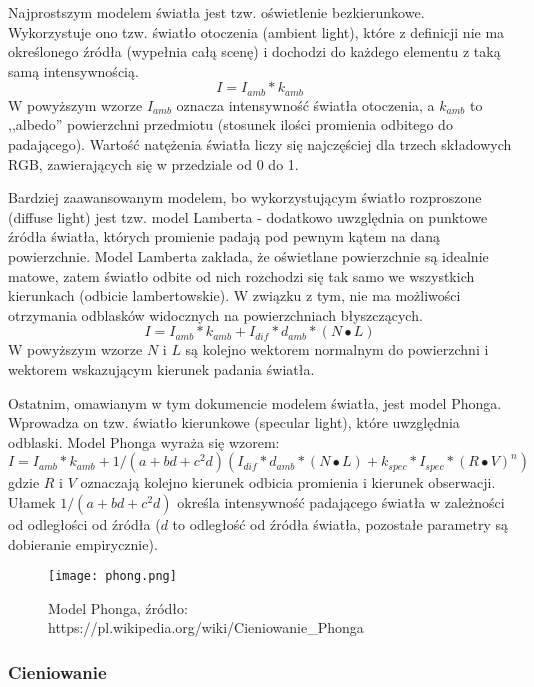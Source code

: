 Najprostszym modelem światła jest tzw. oświetlenie bezkierunkowe. Wykorzystuje ono tzw. światło otoczenia (ambient light), które z definicji nie ma określonego źródła (wypełnia całą scenę) i dochodzi do każdego elementu z taką samą intensywnością.
$$I = I_{amb} * k_{amb}$$
W powyższym wzorze $I_{amb}$ oznacza intensywność światła otoczenia, a $k_{amb}$ to ,,albedo'' powierzchni przedmiotu (stosunek ilości promienia odbitego do padającego). Wartość natężenia światła liczy się najczęściej dla trzech składowych RGB, zawierających się w przedziale od 0 do 1.


Bardziej zaawansowanym modelem, bo wykorzystującym światło rozproszone (diffuse light) jest tzw. model Lamberta - dodatkowo uwzględnia on punktowe źródła światła, których promienie padają pod pewnym kątem na daną powierzchnie. Model Lamberta zakłada, że oświetlane powierzchnie są idealnie matowe, zatem światło odbite od nich rozchodzi się tak samo we wszystkich kierunkach (odbicie lambertowskie). W związku z tym, nie ma możliwości otrzymania odblasków widocznych na powierzchniach błyszczących.
$$I = I_{amb} * k_{amb} + I_{dif} * d_{amb} * (N \bullet L)$$
W powyższym wzorze $N$ i $L$ są kolejno wektorem normalnym do powierzchni i wektorem wskazującym kierunek padania światła.


Ostatnim, omawianym w tym dokumencie modelem światła, jest model Phonga. Wprowadza on tzw. światło kierunkowe (specular light), które uwzględnia odblaski. Model Phonga wyraża się wzorem:
$$I = I_{amb} * k_{amb} + 1/(a + bd + c^2d)(I_{dif} * d_{amb} * (N \bullet L) + k_{spec} * I_{spec} * (R \bullet V)^n)$$
gdzie $R$ i $V$ oznaczają kolejno kierunek odbicia promienia i kierunek obserwacji. Ułamek $1/(a + bd + c^2d)$ określa intensywność padającego światła w zależności od odległości od źródła ($d$ to odległość od źródła światła, pozostałe parametry są dobieranie empirycznie).

\begin{figure}[h!]
\centering
  \caption{Model Phonga, źródło: https://pl.wikipedia.org/wiki/Cieniowanie\_Phonga}
  \texttt{[image: phong.png]}
\end{figure}

\subsubsection{Cieniowanie}



